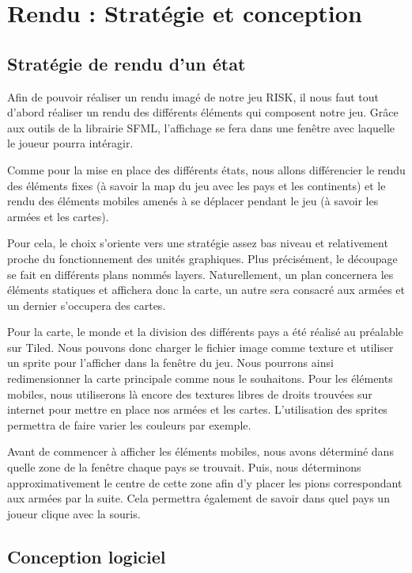 \section{Rendu : Stratégie et conception}

\subsection{Stratégie de rendu d'un état}

Afin de pouvoir réaliser un rendu imagé de notre jeu RISK, il nous faut tout d’abord réaliser un rendu des différents éléments qui composent notre jeu. Grâce aux outils de la librairie SFML, l'affichage se fera dans une fenêtre avec laquelle le joueur pourra intéragir. 

Comme pour la mise en place des différents états, nous allons différencier le rendu des éléments fixes (à savoir la map du jeu avec les pays et les continents) et le rendu des éléments mobiles amenés à se déplacer pendant le jeu (à savoir les armées et les cartes). 

Pour cela, le choix s'oriente vers une stratégie assez bas niveau et relativement proche du fonctionnement des unités graphiques. Plus précisément, le découpage se fait en différents plans nommés layers. Naturellement, un plan concernera les éléments statiques et affichera donc la carte, un autre sera consacré aux armées et un dernier s'occupera des cartes.

Pour la carte, le monde et la division des différents pays a été réalisé au préalable sur Tiled. Nous pouvons donc charger le fichier image comme texture et utiliser un sprite pour l'afficher dans la fenêtre du jeu. Nous pourrons ainsi redimensionner la carte principale comme nous le souhaitons.
Pour les éléments mobiles, nous utiliserons là encore des textures libres de droits trouvées sur internet pour mettre en place nos armées et les cartes. L'utilisation des sprites permettra de faire varier les couleurs par exemple. 

Avant de commencer à afficher les éléments mobiles, nous avons déterminé dans quelle zone de la fenêtre chaque pays se trouvait. Puis, nous déterminons approximativement le centre de cette zone afin d'y placer les pions correspondant aux armées par la suite. Cela permettra également de savoir dans quel pays un joueur clique avec la souris. 

\subsection{Conception logiciel}

